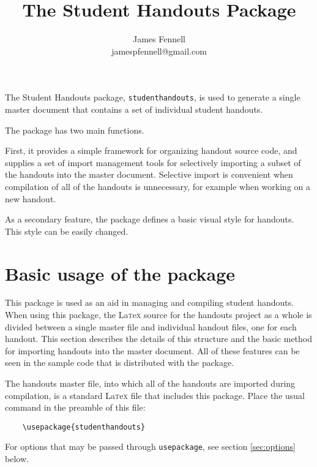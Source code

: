 \documentclass[10pt,oneside,letterpaper]{article}
\title{\vspace{-2\baselineskip}The Student Handouts Package}
\author{James Fennell\\{\normalsize jamespfennell@gmail.com}}
\newcommand{\Latex}{La\textsc{t}e\textsc{x} }
\begin{document}
\maketitle

\noindent
The Student Handouts package, \texttt{studenthandouts}, is used to generate a single master document that contains a set of individual student handouts.


The package has two main functions.

First, it provides a simple framework for organizing handout source code, and supplies a set  of
	import management tools for selectively importing a subset of the handouts into the master document.
Selective import is convenient when compilation of all of the handouts is unnecessary, for example when working on a new handout.

As a secondary feature, the package defines a basic visual style for handouts.
This style can be easily changed.



\tableofcontents






\vfill




\section{Basic usage of the package}



This package is used as an aid in managing and compiling student handouts.
When using this package, the \Latex source for the handouts project as a whole is divided between a 
	single master file and individual handout files, one for each handout.
This section describes the details of this structure and the basic method for importing handouts into the master document.
All of these features can be seen in the sample code that is distributed with the package.




The handouts master file, into which all of the handouts are imported during compilation, is a standard \Latex file that includes this
	package.
Place the usual command in the preamble of this file:
\begin{verbatim}
    \usepackage{studenthandouts}
\end{verbatim}
For options that may be passed through \texttt{usepackage}, see section \ref{sec:options} below.
\end{document}
